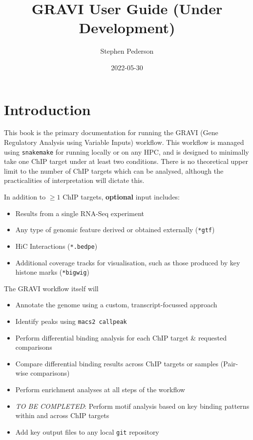 \documentclass[
]{book}
\title{GRAVI User Guide (Under Development)}
\author{Stephen Pederson}
\date{2022-05-30}
\providecommand{\tightlist}{%
  \setlength{\itemsep}{0pt}\setlength{\parskip}{0pt}}
\begin{document}
\maketitle

{
\setcounter{tocdepth}{1}
\tableofcontents
}
\hypertarget{introduction}{%
\chapter{Introduction}\label{introduction}}

This book is the primary documentation for running the GRAVI (Gene Regulatory Analysis using Variable Inputs) workflow.
This workflow is managed using \texttt{snakemake} for running locally or on any HPC, and is designed to minimally take one ChIP target under at least two conditions.
There is no theoretical upper limit to the number of ChIP targets which can be analysed, although the practicalities of interpretation will dictate this.

In addition to \(\geq 1\) ChIP targets, \textbf{optional} input includes:

\begin{itemize}
\tightlist
\item
  Results from a single RNA-Seq experiment
\item
  Any type of genomic feature derived or obtained externally (\texttt{*gtf})
\item
  HiC Interactions (\texttt{*.bedpe})
\item
  Additional coverage tracks for visualisation, such as those produced by key histone marks (\texttt{*bigwig})
\end{itemize}

The GRAVI workflow itself will

\begin{itemize}
\tightlist
\item
  Annotate the genome using a custom, transcript-focussed approach
\item
  Identify peaks using \texttt{macs2\ callpeak}
\item
  Perform differential binding analysis for each ChIP target \& requested comparisons
\item
  Compare differential binding results across ChIP targets or samples (Pair-wise comparisons)
\item
  Perform enrichment analyses at all steps of the workflow
\item
  \emph{TO BE COMPLETED}: Perform motif analysis based on key binding patterns within and across ChIP targets
\item
  Add key output files to any local \texttt{git} repository
\end{itemize}
\end{document}
